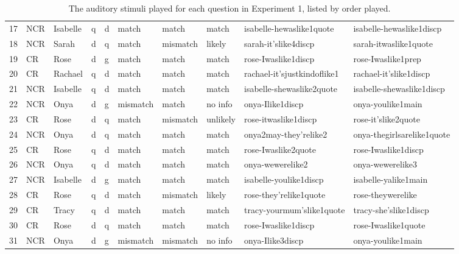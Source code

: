 \begin{table}
\begin{center}
{\begin{tabular}{llllllllll}
17 & NCR & Isabelle & q & d & match & match & match & isabelle-hewaslike1quote & isabelle-hewaslike1discp \\
18 & NCR & Sarah & d & q & match & mismatch & likely & sarah-it'slike4discp	& sarah-itwaslike1quote \\
19 & CR	& Rose	& d & g & match &	match &	match &	rose-Iwaslike1discp & rose-Iwaslike1prep \\
20 & CR & Rachael & q & d & match &	match &	match &	rachael-it'sjustkindoflike1	& rachael-it'slike1discp \\
21 & NCR & Isabelle & q & d & match	& match	& match	& isabelle-shewaslike2quote	& isabelle-shewaslike1discp \\
22 & NCR & Onya & d & g &	mismatch & match & no info & onya-Ilike1discp	& onya-youlike1main  \\
23 & CR	& Rose	& d & q &	match &	mismatch & unlikely &	rose-itwaslike1discp &	rose-it'slike2quote \\
24 & NCR & Onya &	d &	q &	match &	match &	match	& onya2may-they'relike2	& onya-thegirlsarelike1quote \\
25 & CR	& Rose &	q &	d & match &	match &	match &	rose-Iwaslike2quote &	rose-Iwaslike1discp \\
26 & NCR & Onya &	q	& d &	match	& match	& match	& onya-wewerelike2 & onya-wewerelike3 \\
27 & NCR & Isabelle &	d &	g &	match	& match &	match &	isabelle-youlike1discp & isabelle-yalike1main \\
28 & CR &	Rose &	q &	d & match &	mismatch & likely &	rose-they'relike1quote	& rose-theywerelike \\
29 & CR & Tracy &	q	& d & match &	match &	match &	tracy-yourmum'slike1quote &	tracy-she'slike1discp \\
30 & CR &	Rose &	d &	q	& match	& match	& match	& rose-Iwaslike1discp & rose-Iwaslike1quote \\
31 & NCR & Onya	& d &	g	& mismatch & mismatch	& no info &	onya-Ilike3discp & onya-youlike1main \\
   \hline
   
\end{tabular}
}
\caption{The auditory stimuli played for each question in Experiment 1, listed by order played.}\label{tab:appenExp1stimuli}
\end{center}
\end{table}	



